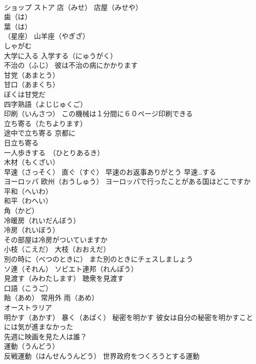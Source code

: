 \documentclass[8pt]{extreport}
\begin{document}
\begin{CJK}{UTF8}{min}
\\	ショップ ストア 店（みせ） 店屋（みせや）
\\	歯（は） 
\\	葉（は）
\\	（星座）	山羊座（やぎざ）
\\	しゃがむ
\\	大学に入る 入学する（にゅうがく）
\\	不治の（ふじ） 彼は不治の病にかかります
\\	甘党（あまとう）
\\	甘口（あまくち）
\\	ぼくは甘党だ
\\	四字熟語（よじじゅくご）
\\	印刷（いんさつ） この機械は１分間に６０ページ印刷できる
\\	立ち寄る（たちよります） 
\\	途中で立ち寄る 京都に 
\\	日立ち寄る
\\	一人歩きする　（ひとりあるき）
\\	木材（もくざい）
\\	早速（さっそく） 直ぐ（すぐ） 早速のお返事ありがとう 早速…する
\\	ヨーロッパ 欧州（おうしゅう） ヨーロッパで行ったことがある国はどこですか
\\	平和（へいわ）
\\	和平（わへい）
\\	角（かど）
\\	冷暖房（れいだんぼう） 
\\	冷房（れいぼう） 
\\	その部屋は冷房がついていますか
\\	小枝（こえだ） 大枝（おおえだ）
\\	別の時に（べつのときに） また別のときにチェスしましょう
\\	ソ連（それん） ソビエト連邦（れんぽう）
\\	見渡す（みわたします） 聴衆を見渡す
\\	口語（こうご）
\\	飴（あめ） 常用外 雨（あめ）　
\\	オーストラリア
\\	明かす（あかす） 暴く（あばく） 秘密を明かす 彼女は自分の秘密を明かすことには気が進まなかった
\\	先週に映画を見た人は誰？
\\	運動（うんどう） 
\\	反戦運動（はんせんうんどう） 世界政府をつくろうとする運動

\end{CJK}
\end{document}
